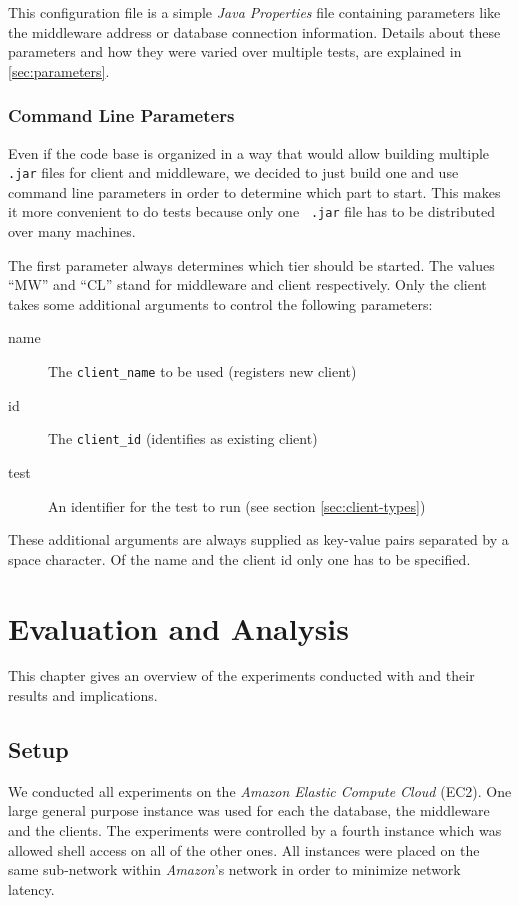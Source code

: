\documentclass[a4paper, oneside]{csthesis}
\begin{document}
    This configuration file is a simple {\it Java Properties}
    file containing parameters like the middleware address or database
    connection information. Details about these parameters and how they were
    varied over multiple tests, are explained in \cref{sec:parameters}.

\subsection{Command Line Parameters}
    Even if the code base is organized in a way that would allow building
    multiple {\tt .jar} files for client and middleware, we decided to just
    build one and use command line parameters in order to determine which part
    to start. This makes it more convenient to do tests because only one {\tt
    .jar} file has to be distributed over many machines.
   
    The first parameter always determines which tier should be started. The
    values ``MW'' and ``CL'' stand for middleware and client respectively.
    Only the client takes some additional arguments to control the following
    parameters:
    
    \begin{description}
    \item[name] The {\tt client\_name} to be used (registers new client)
    \item[id] The {\tt client\_id} (identifies as existing client)
    \item[test] An identifier for the test to run (see section
    \cref{sec:client-types})
    \end{description}

    These additional arguments are always supplied as key-value pairs separated
    by a space character. Of the name and the client id only one has to be
    specified.

\chapter{Evaluation and Analysis}
\label{ch:evaluation}
	This chapter gives an overview of the experiments conducted with \telesto{} and
	their results and implications.

\section{Setup}
	We conducted all experiments on the {\it Amazon Elastic Compute Cloud} (EC2).
    One large general purpose instance was used for each the database, the
    middleware and the clients.
    The experiments were controlled by a fourth instance which was allowed shell access on all of the
    other ones. All instances were placed on the same sub-network within {\it Amazon}'s network in order
    to minimize network latency.
    
\end{document}
